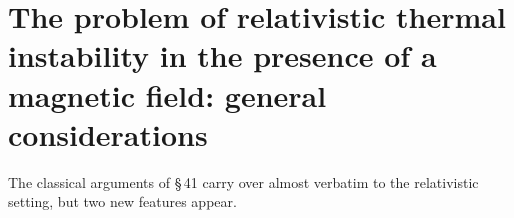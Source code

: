 %
%

\section{The problem of relativistic thermal instability in the
  presence of a magnetic field: general considerations}
\label{sec:rel-41}

The classical arguments of \S\,41 carry over almost verbatim to the
relativistic setting, but two new features appear.

